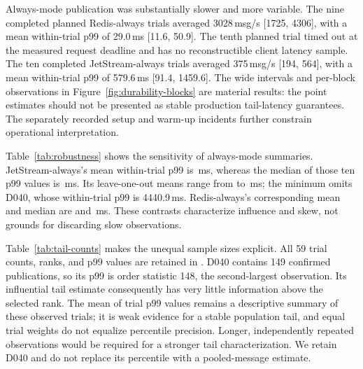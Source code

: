 Always-mode publication was substantially slower and more variable. The nine completed planned Redis-always trials averaged 3028\,msg/s [1725, 4306], with a mean within-trial p99 of 29.0\,ms [11.6, 50.9]. The tenth planned trial timed out at the measured request deadline and has no reconstructible client latency sample. The ten completed JetStream-always trials averaged 375\,msg/s [194, 564], with a mean within-trial p99 of 579.6\,ms [91.4, 1459.6]. The wide intervals and per-block observations in Figure~\ref{fig:durability-blocks} are material results: the point estimates should not be presented as stable production tail-latency guarantees. The separately recorded setup and warm-up incidents further constrain operational interpretation.

\begin{table}[htbp]
\centering\small\setlength{\tabcolsep}{3.5pt}

\caption{Post-observation publication sensitivity. The mean and median summarize completed trials' p99 values. LOO gives the range of means after omitting each completed trial in turn, solely as an influence diagnostic. Early and late rates use blocks 1--5 and 6--10. Redis-always has five early and four late completions; other cells have five in each half. No observation is removed from primary estimates.}
\label{tab:robustness}
\end{table}

Table~\ref{tab:robustness} shows the sensitivity of always-mode summaries. JetStream-always's mean within-trial p99 is \NatsAlwaysPnnMean{}\,ms, whereas the median of those ten p99 values is \NatsAlwaysPnnMedian{}\,ms. Its leave-one-out means range from \NatsAlwaysPnnLooMin{} to \NatsAlwaysPnnLooMax{}\,ms; the minimum omits D040, whose within-trial p99 is 4440.9\,ms. Redis-always's corresponding mean and median are \RedisAlwaysPnnMean{} and \RedisAlwaysPnnMedian{}\,ms. These contrasts characterize influence and skew, not grounds for discarding slow observations.

\begin{table}[htbp]
\centering\small\setlength{\tabcolsep}{4pt}

\caption{Sample information underlying completed publication trials' empirical p99 values. Ranges span the retained trials of each profile. Positions above p99 are $N-\lceil0.99N\rceil$ and do not imply independent tail observations.}
\label{tab:tail-counts}
\end{table}

Table~\ref{tab:tail-counts} makes the unequal sample sizes explicit. All 59 trial counts, ranks, and p99 values are retained in . D040 contains 149 confirmed publications, so its p99 is order statistic 148, the second-largest observation. Its influential tail estimate consequently has very little information above the selected rank. The mean of trial p99 values remains a descriptive summary of these observed trials; it is weak evidence for a stable population tail, and equal trial weights do not equalize percentile precision. Longer, independently repeated observations would be required for a stronger tail characterization. We retain D040 and do not replace its percentile with a pooled-message estimate.

